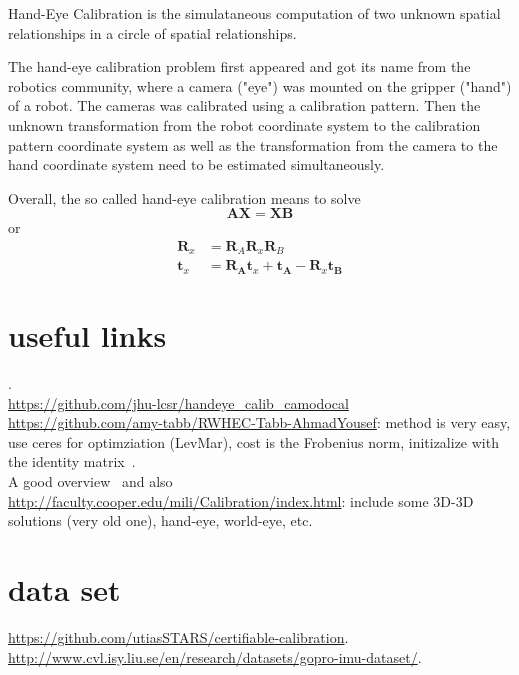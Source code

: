 Hand-Eye Calibration is the simulataneous computation of two unknown spatial relationships in a circle of spatial relationships.

The hand-eye calibration problem first appeared and got its name from the robotics community, where a camera ("eye") was mounted on the gripper ("hand") of a robot. The cameras was calibrated using a calibration pattern. Then the unknown transformation from the robot coordinate system to the calibration pattern coordinate system as well as the transformation from the camera to the hand coordinate system need to be estimated simultaneously.

Overall, the so called hand-eye calibration means to solve 
\begin{equation}
\mathbf{AX=XB}
\end{equation} or 
\begin{align}
\mathbf{R}_x&=\mathbf{R}_A\mathbf{R}_x\mathbf{R}_B \\ 
\mathbf{t}_x&=\mathbf{R_A}\mathbf{t}_x+\mathbf{t_A}-\mathbf{R}_x\mathbf{t_B}
\end{align}

\section{useful links}
\cite{tum_hand_eye}.\\
\url{https://github.com/jhu-lcsr/handeye_calib_camodocal}\\
\url{https://github.com/amy-tabb/RWHEC-Tabb-AhmadYousef}: method is very easy, use ceres for optimziation (LevMar), cost is the Frobenius norm, initizalize with the identity matrix~\cite{tabb2017solving}.\\
A good overview~\cite{shah2012overview} and also \url{http://faculty.cooper.edu/mili/Calibration/index.html}: include some 3D-3D solutions (very old one), hand-eye, world-eye, etc.

\section{data set}
\url{https://github.com/utiasSTARS/certifiable-calibration}.\\ 
\url{http://www.cvl.isy.liu.se/en/research/datasets/gopro-imu-dataset/}.



